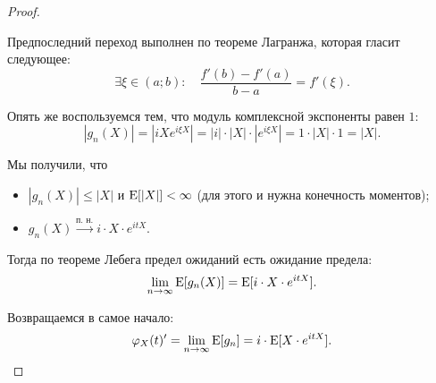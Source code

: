 \begin{proof}
\begin{itemize}
        Предпоследний переход выполнен по теореме Лагранжа, которая гласит следующее:
        \begin{equation*}
            \exists \xi \in (a; b): \quad \dfrac{f'(b) - f'(a)}{b - a} = f'(\xi).
        \end{equation*}

        Опять же воспользуемся тем, что модуль комплексной экспоненты равен $1$:
        \begin{equation*}
            |g_n(X)| 
            = \left|iX e^{i \xi X}\right|
            = |i| \cdot |X| \cdot \left|e^{i \xi X}\right|
            = 1 \cdot |X| \cdot 1
            = |X|.
        \end{equation*}
    \end{itemize}

    Мы получили, что
    \begin{itemize}
    \item 
        $|g_n(X)| \leq |X|$ и $\operatorname{E}[|X|] < \infty$ (для этого и нужна конечность моментов);

    \item 
        $g_n(X) \xrightarrow{\text{п. н.}} i \cdot X \cdot e^{itX}$.
    \end{itemize}

    Тогда по теореме Лебега предел ожиданий есть ожидание предела:
    \begin{equation*}
        \lim_{n \to \infty} \operatorname{E}[g_n(X)] = \operatorname{E}[i \cdot X \cdot e^{itX}].
    \end{equation*}

    Возвращаемся в самое начало:
    \begin{equation*}
        \varphi_X(t)' = \lim_{n \to \infty} \operatorname{E}[g_n] = i \cdot \operatorname{E}[X \cdot e^{itX}].
    \end{equation*}
\end{proof} 